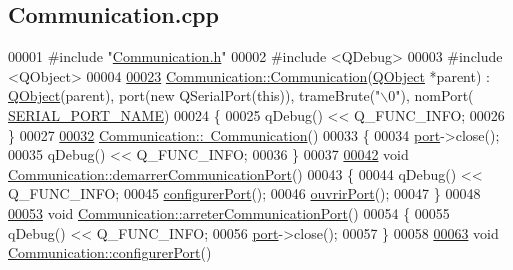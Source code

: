 \hypertarget{_communication_8cpp_source}{}\subsection{Communication.\+cpp}
\label{_communication_8cpp_source}

\begin{DoxyCode}
00001 \textcolor{preprocessor}{#include "\hyperlink{_communication_8h}{Communication.h}"}
00002 \textcolor{preprocessor}{#include <QDebug>}
00003 \textcolor{preprocessor}{#include <QObject>}
00004 
\hyperlink{class_communication_a56cf4b262e592bcae1d987c3dd00487f}{00023} \hyperlink{class_communication_a56cf4b262e592bcae1d987c3dd00487f}{Communication::Communication}(\hyperlink{class_q_object}{QObject} *parent) : 
      \hyperlink{class_q_object}{QObject}(parent), port(new QSerialPort(this)), trameBrute(\textcolor{stringliteral}{"\(\backslash\)0"}), nomPort(
      \hyperlink{_communication_8h_a8542e30f71d5d41f405c329f0e9bafd7}{SERIAL\_PORT\_NAME})
00024 \{
00025     qDebug() << Q\_FUNC\_INFO;
00026 \}
00027 
\hyperlink{class_communication_a75ba08ce908d45251e28e4c1db94e6f4}{00032} \hyperlink{class_communication_a75ba08ce908d45251e28e4c1db94e6f4}{Communication::~Communication}()
00033 \{
00034     \hyperlink{class_communication_aff7d55208f31232fbdc1dcec488908f1}{port}->close();
00035     qDebug() << Q\_FUNC\_INFO;
00036 \}
00037 
\hyperlink{class_communication_a8fe8d15efd2590a1061a015f5f761924}{00042} \textcolor{keywordtype}{void} \hyperlink{class_communication_a8fe8d15efd2590a1061a015f5f761924}{Communication::demarrerCommunicationPort}()
00043 \{
00044     qDebug() << Q\_FUNC\_INFO;
00045     \hyperlink{class_communication_ae39284eac0920a3d11c085b48c6234da}{configurerPort}();
00046     \hyperlink{class_communication_ad5969603a6b7232d0227a461fd479251}{ouvrirPort}();
00047 \}
00048 
\hyperlink{class_communication_aa447a2fe9e2e5c2467a0816865a77340}{00053} \textcolor{keywordtype}{void} \hyperlink{class_communication_aa447a2fe9e2e5c2467a0816865a77340}{Communication::arreterCommunicationPort}()
00054 \{
00055     qDebug() << Q\_FUNC\_INFO;
00056     \hyperlink{class_communication_aff7d55208f31232fbdc1dcec488908f1}{port}->close();
00057 \}
00058 
\hyperlink{class_communication_ae39284eac0920a3d11c085b48c6234da}{00063} \textcolor{keywordtype}{void} \hyperlink{class_communication_ae39284eac0920a3d11c085b48c6234da}{Communication::configurerPort}()

\end{DoxyCode}
